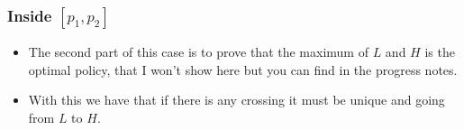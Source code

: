 \documentclass[10pt]{beamer}
\begin{document}
\begin{frame}
    \frametitle{Inside $[p_1,p_2]$}
    \begin{itemize}
        \item The second part of this case is to prove that the maximum of $L$ and $H$ is the optimal policy, that I won't show here but you can find in the progress notes.
        \item With this we have that if there is any crossing it must be unique and going from $L$ to $H$.
    \end{itemize}
    \pause
    \begin{figure}[H]
    \centering
    \label{fig:middle-interval-policy}
    \end{figure}
\end{frame}

\end{document}
